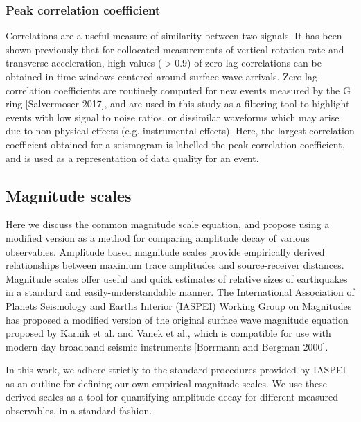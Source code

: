 \documentclass{gji}
\begin{document}

\subsubsection{Peak correlation coefficient}
Correlations are a useful measure of similarity between two signals. It has been shown previously that for collocated measurements of vertical rotation rate and transverse acceleration, high values ($>0.9$) of zero lag correlations can be obtained in time windows centered around surface wave arrivals. %
Zero lag correlation coefficients are routinely computed for new events measured by the G ring [Salvermoser 2017], %
and are used in this study as a filtering tool to highlight events with low signal to noise ratios, or dissimilar waveforms which may arise due to non-physical effects (e.g. instrumental effects). Here, the largest correlation coefficient obtained for a seismogram is labelled the peak correlation coefficient, and is used as a representation of data quality for an event.


\subsection{Magnitude scales}
Here we discuss the common magnitude scale equation, and propose using a modified version as a method for comparing amplitude decay of various observables. Amplitude based magnitude scales provide empirically derived relationships between maximum trace amplitudes and source-receiver distances. Magnitude scales offer useful and quick estimates of relative sizes of earthquakes in a standard and easily-understandable manner. 
The International Association of Planets Seismology and Earths Interior (IASPEI) Working Group on Magnitudes has proposed a modified version of the original surface wave magnitude equation proposed by Karnik et al. and Vanek et al., %
which is compatible for use with modern day broadband seismic instruments [Borrmann and Bergman 2000].

In this work, we adhere strictly to the standard procedures provided by IASPEI as an outline for defining our own empirical magnitude scales. We use these derived scales as a tool for quantifying amplitude decay for different measured observables, in a standard fashion.
\end{document}
